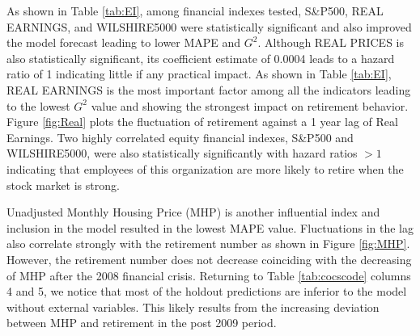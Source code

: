 \documentclass[12pt,letterpaper]{article}
\begin{document}
As shown in Table \ref{tab:EI}, among financial indexes tested, S\&P500, REAL EARNINGS, and WILSHIRE5000 were statistically significant and also improved the model forecast leading to lower MAPE and $G^2$.  Although REAL PRICES is also statistically significant, its coefficient estimate of 0.0004 leads to a hazard ratio of 1 indicating little if any practical impact. As shown in Table \ref{tab:EI}, REAL EARNINGS is the most important factor among all the indicators leading to the lowest $G^2$ value and showing the strongest impact on retirement behavior. Figure \ref{fig:Real} plots the fluctuation of retirement against a 1 year lag of Real Earnings. Two highly correlated equity financial indexes, S\&P500 and WILSHIRE5000, were also statistically significantly with hazard ratios $>1$ indicating that employees of this organization are more likely to retire when the stock market is strong.

Unadjusted Monthly Housing Price (MHP) is another influential index and inclusion in the model resulted in the lowest MAPE value. Fluctuations in the lag also correlate strongly with the retirement number as shown in Figure \ref{fig:MHP}. However, the retirement number does not decrease coinciding with the decreasing of MHP after the 2008 financial crisis. Returning to Table \ref{tab:cocscode} columns 4 and 5, we notice that most of the holdout predictions are inferior to the model without external variables. This likely results from the increasing deviation between MHP and retirement in the post 2009 period.

\end{document}
